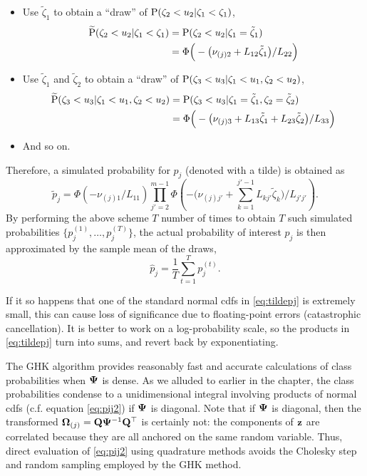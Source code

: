 \begin{itemize}
  \item Use $\tilde\zeta_1$ to obtain a ``draw'' of $\operatorname{P}(\zeta_2 < u_2|\zeta_1 < \zeta_1)$,
  \begin{align*}
    \widetilde{\operatorname{P}}(\zeta_2 < u_2|\zeta_1 < \zeta_1)
    &=\operatorname{P}(\zeta_2 < u_2|\zeta_1 = \tilde\zeta_1) \\
    &= \Phi \Big( - \big(\nu_{(j)2} +  L_{12}\tilde\zeta_1 \big) / L_{22} \Big)
  \end{align*}
  \item Use $\tilde\zeta_1$ and $\tilde\zeta_2$ to obtain a ``draw'' of $\operatorname{P}(\zeta_3 < u_3|\zeta_1 < u_1,\zeta_2 < u_2)$,
  \begin{align*}
    \widetilde{\operatorname{P}}(\zeta_3 < u_3|\zeta_1 < u_1,\zeta_2 < u_2)
    &=\operatorname{P}(\zeta_3 < u_3|\zeta_1 = \tilde\zeta_1,\zeta_2 = \tilde\zeta_2)\\
    &= \Phi \Big( - \big(\nu_{(j)3} + L_{13}\tilde\zeta_1 + L_{23}\tilde\zeta_2 \big) / L_{33} \Big)
  \end{align*} 
  \item And so on. 
\end{itemize}
Therefore, a simulated probability for $p_j$ (denoted with a tilde) is obtained as
\begin{equation}\label{eq:tildepj}
  \tilde p_j = \Phi\left( -\nu_{(j)1}/ L_{11} \right) 
  \prod_{j'=2}^{m-1} \Phi \left( 
  - \big(\nu_{(j)j'} + \textstyle\sum_{k=1}^{j'-1} L_{kj'}\tilde\zeta_k \big) / L_{j'j'} 
  \right).
\end{equation}
By performing the above scheme $T$ number of times to obtain $T$ such simulated probabilities $\{p_j^{(1)},\dots,p_j^{(T)} \}$, the actual probability of interest $p_j$ is then approximated by the sample mean of the draws,
\[
  \hat p_j = \frac{1}{T} \sum_{t=1}^T p_j^{(t)}.
\]

If it so happens that one of the standard normal cdfs in \cref{eq:tildepj} is extremely small, this can cause loss of significance due to floating-point errors (catastrophic cancellation).
It is better to work on a log-probability scale, so the products in \cref{eq:tildepj} turn into sums, and revert back by exponentiating.

\begin{remark}
  The GHK algorithm provides reasonably fast and accurate calculations of class probabilities when ${\bm\Psi}$ is dense.
  As we alluded to earlier in the chapter, the class probabilities condense to a unidimensional integral involving products of normal cdfs (c.f. equation \ref{eq:pij2}) if ${\bm\Psi}$ is diagonal.
  Note that if ${\bm\Psi}$ is diagonal, then the transformed ${\bm\Omega}_{(j)} = {\mathbf Q}{\bm\Psi}^{-1}{\mathbf Q}^\top$ is certainly not: the components of ${\mathbf z}$ are correlated because they are all anchored on the same random variable.
  Thus, direct evaluation of \cref{eq:pij2} using quadrature methods avoids the Cholesky step and random sampling employed by the GHK method.
\end{remark}

